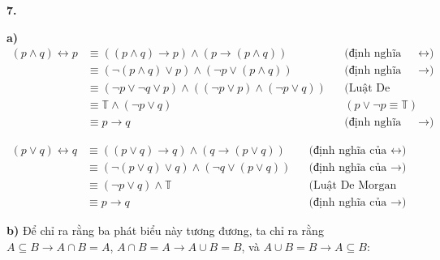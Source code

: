 \documentclass[12pt,a4paper]{article}
\theoremstyle{definition}
\begin{document}
\bigskip
\textbf{7.}

\textbf{a)}
\begin{align*}
(p \land q) \leftrightarrow p &\equiv ((p \land q) \to p) \land (p \to (p \land q)) && \text{(định nghĩa của $\leftrightarrow$)}\\
&\equiv (\neg(p \land q) \lor p) \land (\neg p \lor (p \land q)) && \text{(định nghĩa của $\to$)}\\
&\equiv (\neg p \lor \neg q \lor p) \land ((\neg p \lor p) \land (\neg p \lor q)) && \text{(Luật De Morgan và Phân phối)}\\
&\equiv \mathbb{T} \land (\neg p \lor q) && (p \lor \neg p \equiv \mathbb{T})\\
&\equiv p \to q && \text{(định nghĩa của $\to$)}
\end{align*}

\begin{align*}
(p \lor q) \leftrightarrow q &\equiv ((p \lor q) \to q) \land (q \to (p \lor q)) && \text{(định nghĩa của $\leftrightarrow$)}\\
&\equiv (\neg(p \lor q) \lor q) \land (\neg q \lor (p \lor q)) && \text{(định nghĩa của $\to$)}\\
&\equiv (\neg p \lor q) \land \mathbb{T} && \text{(Luật De Morgan và Phân phối)}\\
&\equiv p \to q && \text{(định nghĩa của $\to$)}
\end{align*}

\textbf{b)} Để chỉ ra rằng ba phát biểu này tương đương, ta chỉ ra rằng $A \subseteq B \to A \cap B = A$, $A \cap B = A \to A \cup B = B$, và $A \cup B = B \to A \subseteq B$:
\end{document}
